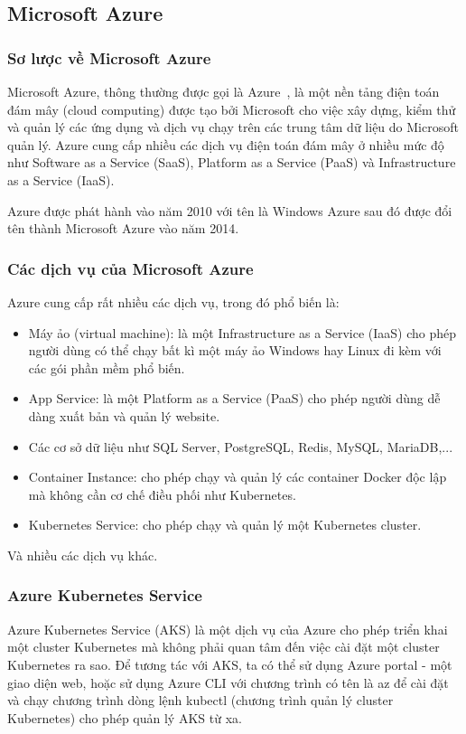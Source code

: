 \subsection{Microsoft Azure}
\subsubsection{Sơ lược về Microsoft Azure}
Microsoft Azure, thông thường được gọi là
Azure~\cite{microsoftazure:online}, là một nền
tảng điện toán đám mây (cloud computing) được tạo bởi Microsoft
cho việc xây dựng, kiểm thử và quản lý các ứng dụng và dịch vụ
chạy trên các trung tâm dữ liệu do Microsoft quản lý. Azure
cung cấp nhiều các dịch vụ điện toán đám mây ở nhiều mức độ như
Software as a Service (SaaS), Platform as a Service (PaaS)
và Infrastructure as a Service (IaaS). 

Azure được phát hành vào năm 2010 với tên là Windows Azure sau
đó được đổi tên thành Microsoft Azure vào năm 2014. 

\subsubsection{Các dịch vụ của Microsoft Azure}
Azure cung cấp rất nhiều các dịch vụ, trong đó phổ biến là:
\begin{itemize}[topsep=0ex]
\item Máy ảo (virtual machine): là một Infrastructure as a Service
(IaaS) cho phép người dùng có thể chạy bất kì một máy ảo Windows
hay Linux đi kèm với các gói phần mềm phổ biến.

\item App Service: là một Platform as a Service (PaaS) cho phép
người dùng dễ dàng xuất bản và quản lý website.

\item Các cơ sở dữ liệu như SQL Server, PostgreSQL, Redis,
MySQL, MariaDB,...

\item Container Instance: cho phép chạy và quản lý các container
Docker độc lập mà không cần cơ chế điều phối như Kubernetes.

\item Kubernetes Service: cho phép chạy và quản lý một
Kubernetes cluster.
\end{itemize}
Và nhiều các dịch vụ khác.

\subsubsection{Azure Kubernetes Service}
Azure Kubernetes Service (AKS) là một dịch vụ của Azure cho phép triển
khai một cluster Kubernetes mà không phải quan tâm đến việc cài đặt một
cluster Kubernetes ra sao. Để tương tác với AKS, ta có thể sử dụng
Azure portal - một giao diện web, hoặc sử dụng Azure CLI với
chương trình có tên là az để cài đặt và chạy chương trình dòng
lệnh kubectl (chương trình quản lý cluster Kubernetes) cho phép
quản lý AKS từ xa. 
